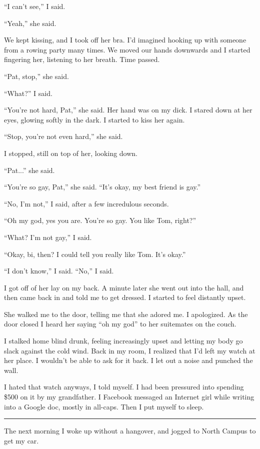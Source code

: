 ``I can't see,'' I said.  

``Yeah,'' she said.

We kept kissing, and I took off her bra.  I'd imagined hooking up with someone
from a rowing party many times.  We moved our hands downwards and I started
fingering her, listening to her breath.  Time passed.

``Pat, stop,'' she said.

``What?'' I said.

``You're not hard, Pat,'' she said.  Her hand was on my dick.  I stared down at
her eyes, glowing softly in the dark.  I started to kiss her again.

``Stop, you're not even hard,'' she said.

I stopped, still on top of her, looking down.

``Pat...'' she said.

``You're so gay, Pat,'' she said.  ``It's okay, my best friend is gay.''

``No, I'm not,'' I said, after a few incredulous seconds.

``Oh my god, yes you are.  You're so gay.  You like Tom, right?''

``What?  I'm not gay,'' I said.

``Okay, bi, then?  I could tell you really like Tom.  It's okay.''

``I don't know,'' I said.  ``No,'' I said.

I got off of her lay on my back.  A minute later she went out into the hall, and
then came back in and told me to get dressed.  I started to feel distantly
upset.

She walked me to the door, telling me that she adored me.  I apologized.  As the
door closed I heard her saying ``oh my god'' to her suitemates on the couch.

I stalked home blind drunk, feeling increasingly upset and letting my body go
slack against the cold wind.  Back in my room, I realized that I'd left my watch
at her place.  I wouldn't be able to ask for it back.  I let out a noise and
punched the wall. 

I hated that watch anyways, I told myself. I had been pressured into spending
\$500 on it by my grandfather.  I Facebook messaged an Internet girl while
writing into a Google doc, mostly in all-caps.  Then I put myself to sleep.

\plainfancybreak{12pt}{2}{* * *}

The next morning I woke up without a hangover, and jogged to North Campus to get
my car.  

